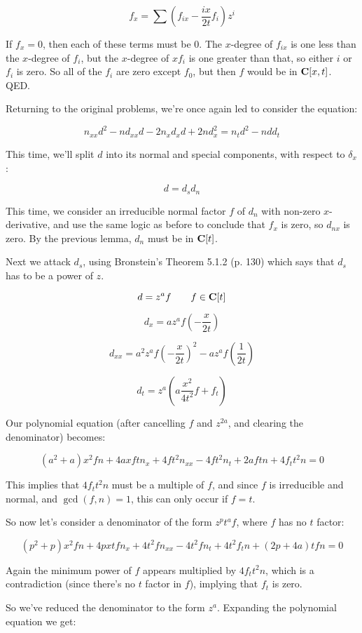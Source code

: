 \documentclass{article}
\newcommand{\C}{\ensuremath{{\bf C}}}
\begin{document}
$$f_x = \sum \left( f_{ix} - \frac{ix}{2t} f_i \right) z^i$$

If $f_x = 0$, then each of these terms must be 0.  The $x$-degree of $f_{ix}$
is one less than the $x$-degree of $f_i$, but the $x$-degree of $xf_i$ is
one greater than that, so either $i$ or $f_i$ is zero.  So all of the $f_i$
are zero except $f_0$, but then $f$ would be in $\C[x,t]$.  QED.

Returning to the original problems, we're once again led to consider the equation:

$$n_{xx} d^2 - n d_{xx} d - 2 n_{x}d_{x}d + 2nd_x^2 = n_t d^2 - n d d_t$$

This time, we'll split $d$ into its normal and special components,
with respect to $\delta_x$:

$$d =d_s d_n$$

This time, we consider an irreducible normal factor $f$ of $d_n$ with
non-zero $x$-derivative, and use the same logic as before to conclude
that $f_x$ is zero, so $d_{nx}$ is zero.  By the previous lemma,
$d_{n}$ must be in $\C[t]$.

Next we attack $d_s$, using Bronstein's Theorem 5.1.2 (p. 130) which
says that $d_s$ has to be a power of $z$.

$$d=z^a f \qquad f \in \C[t]$$

$$d_x = a z^a f \left( - \frac{x}{2t} \right)$$

$$d_{xx} = a^2 z^a f \left( - \frac{x}{2t} \right)^2 - a z^a f \left( \frac{1}{2t} \right)$$

$$d_t = z^a \left( a \frac{x^2}{4t^2} f + f_t\right)$$

Our polynomial equation (after cancelling $f$ and $z^{2a}$, and clearing the denominator) becomes:

$$(a^{2} +a)x^{2}fn +4axftn_x +4ft^{2}n_{xx} -4ft^{2}n_t +2aftn +4f_tt^{2}n = 0$$

This implies that $4f_tt^{2}n$ must be a multiple of $f$, and since $f$ is irreducible and normal,
and $\gcd(f,n)=1$, this can only occur if $f=t$.

So now let's consider a denominator of the form $z^p t^a f$, where $f$ has no $t$ factor:

$$(p^{2} +p)x^{2}fn +4pxtfn_x +4t^{2}fn_{xx} -4t^{2}fn_t +4t^{2}f_tn +(2p +4a)tfn = 0$$

Again the minimum power of $f$ appears multiplied by $4f_tt^{2}n$, which is a contradiction
(since there's no $t$ factor in $f$), implying that $f_t$ is zero.

So we've reduced the denominator to the form $z^a$.  Expanding the polynomial equation we get:
\end{document}
